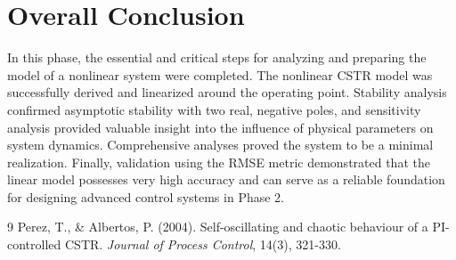 \documentclass[12pt,a4paper]{article}
\begin{document}
\section{Overall Conclusion}
In this phase, the essential and critical steps for analyzing and preparing the model of a nonlinear system were completed. The nonlinear CSTR model was successfully derived and linearized around the operating point. Stability analysis confirmed asymptotic stability with two real, negative poles, and sensitivity analysis provided valuable insight into the influence of physical parameters on system dynamics. Comprehensive analyses proved the system to be a minimal realization. Finally, validation using the RMSE metric demonstrated that the linear model possesses very high accuracy and can serve as a reliable foundation for designing advanced control systems in Phase 2.

\begin{thebibliography}{9}
Perez, T., \& Albertos, P. (2004). Self-oscillating and chaotic behaviour of a PI-controlled CSTR. \textit{Journal of Process Control}, 14(3), 321-330.
\end{thebibliography}
\end{document}
